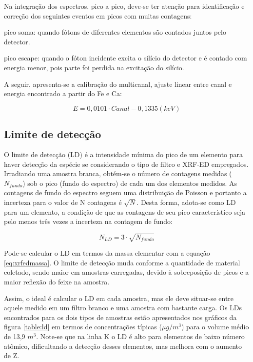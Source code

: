 Na integração dos espectros, pico a pico, deve-se ter atenção 
para identificação e correção dos seguintes eventos em picos com 
muitas contagens: 

\begin{itemize}
  \begin{spacing}{1.0}
  \item pico soma: quando fótons de diferentes elementos são contados
        juntos pelo detector. 
  \item pico escape: quando o fóton incidente excita o silício do detector
        e é contado com energia menor, pois parte foi perdida na excitação 
        do silício. 
  \end{spacing}
\end{itemize}

A seguir, apresenta-se a calibração do multicanal, ajuste linear entre canal 
e energia encontrado a partir do Fe e Ca:

\begin{equation}
  E = 0,0101 \cdot Canal - 0,1335 (keV)
\end{equation}

\subsection{Limite de detecção}

O limite de detecção (LD) é a intensidade mínima do pico de um elemento para haver 
detecção da espécie se considerando o tipo de filtro e XRF-ED empregados. 
Irradiando uma amostra branca, obtém-se o número de contagens 
medidas ($N_{fundo}$) sob o pico (fundo do espectro) de cada um dos elementos
medidos.
As contagens de fundo do espectro seguem uma distribuição de Poisson e portanto 
a incerteza para o valor de N contagens é $\sqrt{N}$.
Desta forma, adota-se como LD para um elemento, a condição de que as contagens de seu pico 
característico seja pelo menos três vezes a incerteza na contagem de fundo:

\begin{equation}
  \label{eq:limitedeteccao}
  N_{LD} = 3 \cdot \sqrt{N_{fundo}}
\end{equation}

Pode-se calcular o LD em termos da massa elementar com a 
equação \ref{eq:xrfedmassa}. O limite de detecção muda conforme a quantidade de 
material coletado, sendo maior em amostras carregadas, devido à sobreposição de 
picos e a maior reflexão do feixe na amostra.

Assim, o ideal é calcular o LD em cada amostra, mas ele deve situar-se entre 
aquele medido em um filtro branco e uma amostra com bastante carga.
Os LDs encontrados para os dois tipos de amostras estão apresentados 
nos gráficos da figura \ref{table:ld} em termos de concentrações típicas 
($\mu g / m^3$) para o volume médio de 13,9 $m^3$. 
Note-se que na linha K o LD é alto para elementos de baixo número atômico, 
dificultando a detecção desses elementos, mas melhora com o aumento de Z. 

